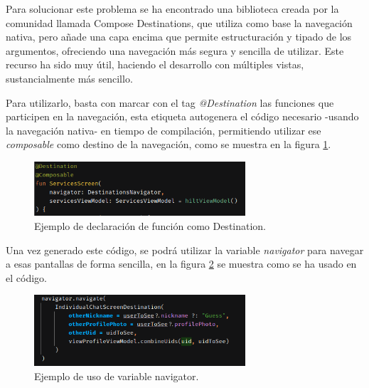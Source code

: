 Para solucionar este problema se ha encontrado una biblioteca creada por la comunidad llamada 
Compose Destinations\hyperlink{cap:biblio}{}, que utiliza como base la navegación nativa, pero añade una capa encima que permite estructuración y tipado de los argumentos, ofreciendo una navegación más segura y sencilla de utilizar. Este recurso ha sido muy útil, haciendo el desarrollo con múltiples vistas, sustancialmente más sencillo.

Para utilizarlo, basta con marcar con el tag \textit{@Destination} las funciones que participen en la navegación, esta etiqueta autogenera el código necesario -usando la navegación nativa- en tiempo de compilación, permitiendo utilizar ese \textit{composable} como destino de la navegación, como se muestra en la figura \ref{fig:ejemplo_destination}. 
\begin{figure}[h]
	\centering
	\includegraphics[width = 0.7\textwidth]{Imagenes/Fuentes/ejemplo_destination.png}
	\caption{Ejemplo de declaración de función como Destination.}
	\label{fig:ejemplo_destination}
\end{figure}

Una vez generado este código, se podrá utilizar la variable \textit{navigator} para navegar a esas pantallas de forma sencilla, en la figura \ref{fig:ejemplo_navigator} se muestra como se ha usado en el código. 
\begin{figure}[h]
	\centering
	\includegraphics[width = 0.7\textwidth]{Imagenes/Fuentes/ejemplo_navigator.png}
	\caption{Ejemplo de uso de variable navigator.}
	\label{fig:ejemplo_navigator}
\end{figure}

\hypertarget{subsec:coil}{}

